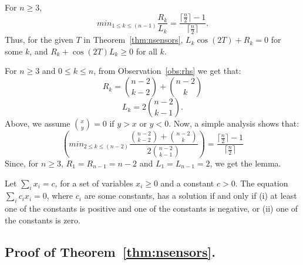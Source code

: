 % 


\begin{lem-prf}
For $n\geq3$,
$$min_{1 \leq k \leq (n-1)} \frac{R_k}{L_k} =  \frac{\lceil \frac{n}{2} \rceil - 1}{\lceil \frac{n}{2} \rceil}.$$ 
Thus, for the given $T$ in Theorem~\ref{thm:nsensors}, $L_k\cos(2T) + R_k = 0$ for some $k$, and 
$R_k + \cos(2T)L_k \geq 0$ for all $k$.
\label{lemma:t}
\end{lem-prf}
\begin{prf}
For  $n \geq 3$ and $0 \leq k \leq n$, from Observation~\ref{obs:rhs} we get that: 
$$R_k = {n-2 \choose k-2} + {n-2 \choose k}$$
$$L_k = 2 {n-2 \choose k-1}.$$
Above, we assume ${x \choose y} = 0$ if $y > x$ or $y < 0$.
Now, a simple analysis shows that:
$$\left(min_{2 \leq k \leq (n-2)} \frac{{n-2 \choose k-2} + {n-2 \choose k}}{2 {n-2 \choose k-1}}\right) =  \frac{\lceil \frac{n}{2} \rceil - 1}{\lceil \frac{n}{2} \rceil}$$ 
Since, for $n \geq 3$, $R_1 = R_{n-1} = n-2$ and $L_1=L_{n-1}=2$, we get the lemma. 
\end{prf}

\begin{observation}
Let $\sum_i x_i =c$, for a set of variables $x_i \geq 0$ and a constant $c > 0$.
The equation $\sum_i c_ix_i = 0$, where $c_i$ are some constants, has a solution if and only if (i) at least one of the constants is positive and one of the constants is negative, or (ii) one of the constants is zero.
\label{obs:pos-neg}
\end{observation}


\subsection{Proof of Theorem~\ref{thm:nsensors}.}

